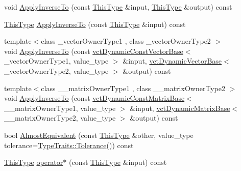 \begin{DoxyCompactItemize}
\item 
void \hyperlink{classvct_quaternion_rotation3_base_afe92782ee4eb089405be71a71e52d9eb}{Apply\-Inverse\-To} (const \hyperlink{classvct_quaternion_base_af28efdc38acf89acb7a67afada11408c}{This\-Type} \&input, \hyperlink{classvct_quaternion_base_af28efdc38acf89acb7a67afada11408c}{This\-Type} \&output) const 
\item 
\hyperlink{classvct_quaternion_base_af28efdc38acf89acb7a67afada11408c}{This\-Type} \hyperlink{classvct_quaternion_rotation3_base_a71037e72bd6869d7773006c7bb77e04b}{Apply\-Inverse\-To} (const \hyperlink{classvct_quaternion_base_af28efdc38acf89acb7a67afada11408c}{This\-Type} \&input) const 
\item 
{\footnotesize template$<$class \-\_\-vector\-Owner\-Type1 , class \-\_\-vector\-Owner\-Type2 $>$ }\\void \hyperlink{classvct_quaternion_rotation3_base_a6febf7108436b0ae6935c8bb5557cfa7}{Apply\-Inverse\-To} (const \hyperlink{classvct_dynamic_const_vector_base}{vct\-Dynamic\-Const\-Vector\-Base}$<$ \-\_\-vector\-Owner\-Type1, value\-\_\-type $>$ \&input, \hyperlink{classvct_dynamic_vector_base}{vct\-Dynamic\-Vector\-Base}$<$ \-\_\-vector\-Owner\-Type2, value\-\_\-type $>$ \&output) const 
\item 
{\footnotesize template$<$class \-\_\-\-\_\-matrix\-Owner\-Type1 , class \-\_\-\-\_\-matrix\-Owner\-Type2 $>$ }\\void \hyperlink{classvct_quaternion_rotation3_base_a99017a2bf77db7f404eddfc6ac44e899}{Apply\-Inverse\-To} (const \hyperlink{classvct_dynamic_const_matrix_base}{vct\-Dynamic\-Const\-Matrix\-Base}$<$ \-\_\-\-\_\-matrix\-Owner\-Type1, value\-\_\-type $>$ \&input, \hyperlink{classvct_dynamic_matrix_base}{vct\-Dynamic\-Matrix\-Base}$<$ \-\_\-\-\_\-matrix\-Owner\-Type2, value\-\_\-type $>$ \&output) const 
\item 
bool \hyperlink{classvct_quaternion_rotation3_base_aa525dec7b10d16177b9e4b59685ba0b0}{Almost\-Equivalent} (const \hyperlink{classvct_quaternion_base_af28efdc38acf89acb7a67afada11408c}{This\-Type} \&other, value\-\_\-type tolerance=\hyperlink{classcmn_type_traits_adc129bf9867295b90d300768b780fa99}{Type\-Traits\-::\-Tolerance}()) const 
\item 
\hyperlink{classvct_quaternion_base_af28efdc38acf89acb7a67afada11408c}{This\-Type} \hyperlink{classvct_quaternion_rotation3_base_a227f3e3cdab401dd2270a70bdd925c0f}{operator$\ast$} (const \hyperlink{classvct_quaternion_base_af28efdc38acf89acb7a67afada11408c}{This\-Type} \&input) const 
\end{DoxyCompactItemize}
